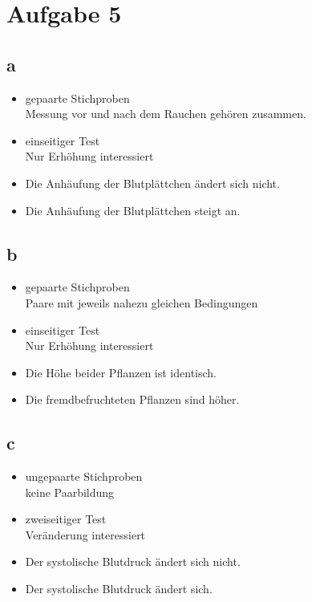 

\section{Aufgabe 5}

\subsection{a}
\begin{itemize}
  \item gepaarte Stichproben \\
        Messung vor und nach dem Rauchen gehören zusammen. 
  \item einseitiger Test \\
        Nur Erhöhung interessiert
  \item Die Anhäufung der Blutplättchen ändert sich nicht. 
  \item Die Anhäufung der Blutplättchen steigt an. 
\end{itemize}

\subsection{b}
\begin{itemize}
  \item gepaarte Stichproben \\
        Paare mit jeweils nahezu gleichen Bedingungen
  \item einseitiger Test \\
        Nur Erhöhung interessiert
  \item Die Höhe beider Pflanzen ist identisch. 
  \item Die fremdbefruchteten Pflanzen sind höher. 
\end{itemize}

\subsection{c}
\begin{itemize}
  \item ungepaarte Stichproben \\
        keine Paarbildung
  \item zweiseitiger Test \\
        Veränderung interessiert
  \item Der systolische Blutdruck ändert sich nicht. 
  \item Der systolische Blutdruck ändert sich. 
\end{itemize}

